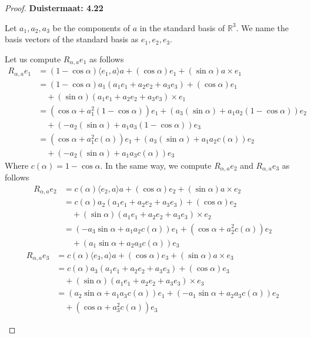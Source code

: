 \documentclass[11pt]{article}
\newcommand{\R}{\mathbb{R}}
\theoremstyle{definition}
\begin{document}
\begin{proof}{\textbf{Duistermaat: 4.22}}
\begin{itemize}
    Let $a_1,a_2,a_3$ be the components of $a$ in the standard basis of
    $\R^3$. We name the basis vectors of the standard basis as $e_1, e_2, e_3$.
    
    Let us compute $R_{\alpha,a} e_1$ as follows
    \begin{align*}
        R_{\alpha,a} e_1 &= (1 - \cos\alpha)\langle e_1, a\rangle a
        + (\cos\alpha)e_1 + (\sin\alpha)a \times e_1\\
        &= (1 - \cos\alpha)a_1 (a_1e_1 + a_2e_2 + a_3e_3) + (\cos\alpha)e_1\\
        &\quad + (\sin\alpha)(a_1e_1 + a_2e_2 + a_3e_3) \times e_1\\
        &= (\cos\alpha + a_1^2(1 - \cos\alpha))e_1 
        + (a_3(\sin\alpha) + a_1a_2(1 - \cos\alpha)) e_2\\
        &\quad + (-a_2(\sin\alpha) + a_1a_3(1 - \cos\alpha))e_3\\
        &= (\cos\alpha + a_1^2c(\alpha))e_1 
        + (a_3(\sin\alpha) + a_1a_2c(\alpha)) e_2\\
        &\quad + (-a_2(\sin\alpha) + a_1a_3c(\alpha))e_3
    \end{align*}
    Where $c(\alpha) = 1 - \cos\alpha$. In the same way, we compute
    $R_{\alpha, a}e_2$ and $R_{\alpha, a}e_3$ as follows
    \begin{align*}
        R_{\alpha,a} e_2 &= c(\alpha)\langle e_2, a\rangle a
        + (\cos\alpha)e_2 + (\sin\alpha)a \times e_2\\
        &= c(\alpha)a_2 (a_1e_1 + a_2e_2 + a_3e_3) + (\cos\alpha)e_2\\
        &\quad + (\sin\alpha)(a_1e_1 + a_2e_2 + a_3e_3) \times e_2\\
        &= (-a_3\sin\alpha + a_1a_2c(\alpha))e_1
        + (\cos\alpha + a_2^2c(\alpha)) e_2\\
        &\quad + (a_1\sin\alpha + a_2a_3c(\alpha))e_3
    \end{align*}
    \begin{align*}
        R_{\alpha,a} e_3 &= c(\alpha)\langle e_3, a\rangle a
        + (\cos\alpha)e_3 + (\sin\alpha)a \times e_3\\
        &= c(\alpha)a_3 (a_1e_1 + a_2e_2 + a_3e_3) + (\cos\alpha)e_3\\
        &\quad + (\sin\alpha)(a_1e_1 + a_2e_2 + a_3e_3) \times e_3\\
        &= (a_2\sin\alpha + a_1a_3c(\alpha))e_1
        + (-a_1\sin\alpha + a_2a_3c(\alpha)) e_2\\
        &\quad + (\cos\alpha + a_3^2c(\alpha))e_3

\end{align*}
\end{itemize}
\end{proof}
\end{document}
